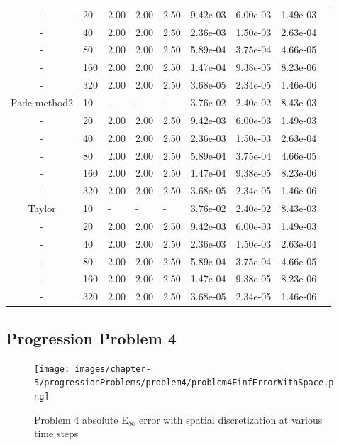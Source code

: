 \begin{table}[p]
{\begin{tabular}{cllllllll}
   - &   20 & 2.00 & 2.00 & 2.50 & 9.42e-03 & 6.00e-03 & 1.49e-03 \\  
   - &   40 & 2.00 & 2.00 & 2.50 & 2.36e-03 & 1.50e-03 & 2.63e-04 \\  
   - &   80 & 2.00 & 2.00 & 2.50 & 5.89e-04 & 3.75e-04 & 4.66e-05 \\  
   - &  160 & 2.00 & 2.00 & 2.50 & 1.47e-04 & 9.38e-05 & 8.23e-06 \\  
   - &  320 & 2.00 & 2.00 & 2.50 & 3.68e-05 & 2.34e-05 & 1.46e-06 \\  
   \hline
   Pade-method2 &   10 & - & - & - & 3.76e-02 & 2.40e-02 & 8.43e-03 \\  
   - &   20 & 2.00 & 2.00 & 2.50 & 9.42e-03 & 6.00e-03 & 1.49e-03 \\  
   - &   40 & 2.00 & 2.00 & 2.50 & 2.36e-03 & 1.50e-03 & 2.63e-04 \\  
   - &   80 & 2.00 & 2.00 & 2.50 & 5.89e-04 & 3.75e-04 & 4.66e-05 \\  
   - &  160 & 2.00 & 2.00 & 2.50 & 1.47e-04 & 9.38e-05 & 8.23e-06 \\  
   - &  320 & 2.00 & 2.00 & 2.50 & 3.68e-05 & 2.34e-05 & 1.46e-06 \\  
   \hline
   Taylor &   10 & - & - & - & 3.76e-02 & 2.40e-02 & 8.43e-03 \\  
   - &   20 & 2.00 & 2.00 & 2.50 & 9.42e-03 & 6.00e-03 & 1.49e-03 \\  
   - &   40 & 2.00 & 2.00 & 2.50 & 2.36e-03 & 1.50e-03 & 2.63e-04 \\  
   - &   80 & 2.00 & 2.00 & 2.50 & 5.89e-04 & 3.75e-04 & 4.66e-05 \\  
   - &  160 & 2.00 & 2.00 & 2.50 & 1.47e-04 & 9.38e-05 & 8.23e-06 \\  
   - &  320 & 2.00 & 2.00 & 2.50 & 3.68e-05 & 2.34e-05 & 1.46e-06 \\  
   \hline
   \end{tabular}
   }
\end{table}

\clearpage

\subsection{Progression Problem 4}
\begin{figure}[p]
    \centering
    \texttt{[image: images/chapter-5/progressionProblems/problem4/problem4EinfErrorWithSpace.png]}
    \caption{Problem 4 absolute E${}_{\infty}$ error with spatial discretization at various time steps }
    \label{fig:problem4_linferror_spatial_results}
\end{figure}


